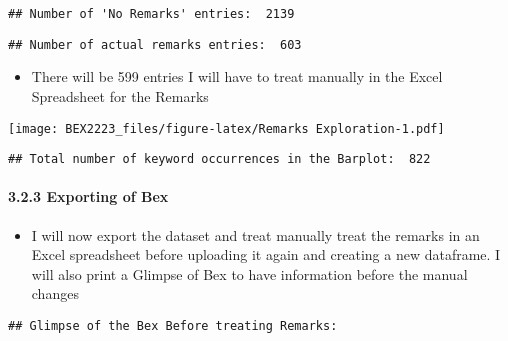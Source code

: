 \documentclass[
]{article}
\providecommand{\tightlist}{%
  \setlength{\itemsep}{0pt}\setlength{\parskip}{0pt}}
\begin{document}
\begin{verbatim}
## Number of 'No Remarks' entries:  2139
\end{verbatim}

\begin{verbatim}
## Number of actual remarks entries:  603
\end{verbatim}

\begin{itemize}
\tightlist
\item
  There will be 599 entries I will have to treat manually in the Excel
  Spreadsheet for the Remarks
\end{itemize}

\texttt{[image: BEX2223\_files/figure-latex/Remarks Exploration-1.pdf]}

\begin{verbatim}
## Total number of keyword occurrences in the Barplot:  822
\end{verbatim}

\hypertarget{exporting-of-bex}{%
\paragraph{3.2.3 Exporting of Bex}\label{exporting-of-bex}}

\begin{itemize}
\tightlist
\item
  I will now export the dataset and treat manually treat the remarks in
  an Excel spreadsheet before uploading it again and creating a new
  dataframe. I will also print a Glimpse of Bex to have information
  before the manual changes
\end{itemize}

\begin{verbatim}
## Glimpse of the Bex Before treating Remarks:
\end{verbatim}
\end{document}
